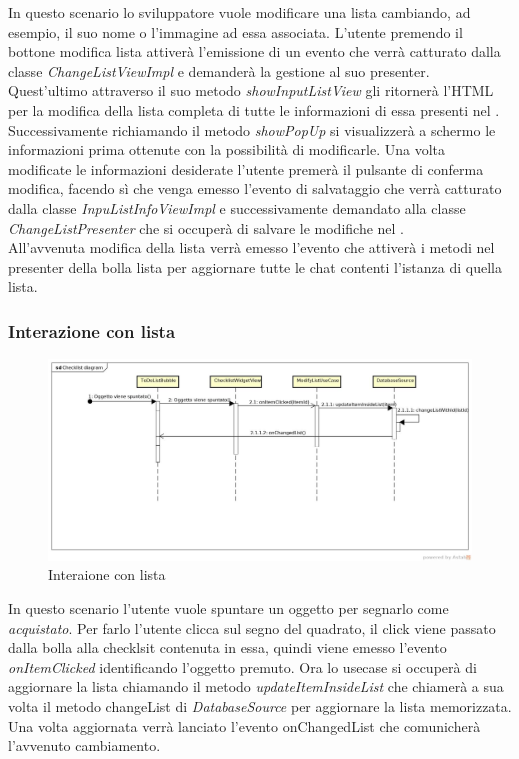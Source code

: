 In questo scenario lo sviluppatore vuole modificare una lista cambiando, ad esempio, il suo nome o l'immagine ad essa associata. L'utente premendo il bottone modifica lista attiverà l'emissione di un evento che verrà catturato dalla classe \textit{ChangeListViewImpl} e demanderà la  gestione al suo presenter. Quest'ultimo attraverso il suo  metodo \textit{showInputListView} gli ritornerà l'HTML per la modifica della lista completa di tutte le informazioni di essa presenti nel . Successivamente richiamando il metodo \textit{showPopUp} si visualizzerà a schermo  le informazioni prima ottenute con la possibilità di modificarle. Una volta modificate le informazioni desiderate l'utente premerà il pulsante di conferma modifica, facendo sì che venga emesso l'evento di salvataggio che verrà catturato dalla classe \textit{InpuListInfoViewImpl} e successivamente demandato alla classe \textit{ChangeListPresenter} che si occuperà di salvare le modifiche nel . \\
All'avvenuta modifica della lista  verrà emesso l'evento che attiverà i metodi nel presenter della bolla lista per aggiornare tutte le chat contenti l'istanza di quella lista.
 
\subsubsection{Interazione con lista }

\label{Interaione con lista}
\begin{figure}[H]
	\centering
	\includegraphics[width=\textwidth]{Sezioni/Diagrammi/App/Checklist_diagram.jpg}
	\caption{Interaione con lista}
\end{figure}

In questo scenario l'utente vuole spuntare un oggetto per segnarlo come \textit{acquistato}.
Per farlo l'utente clicca sul segno del quadrato, il click viene passato dalla bolla alla checklsit contenuta in essa, quindi viene emesso l'evento \textit{onItemClicked} identificando l'oggetto premuto. Ora lo usecase si occuperà di aggiornare la lista chiamando il metodo \textit{updateItemInsideList} che chiamerà a sua volta il metodo changeList di \textit{DatabaseSource} per aggiornare la lista memorizzata. Una volta aggiornata verrà lanciato l'evento onChangedList che comunicherà l'avvenuto cambiamento.


